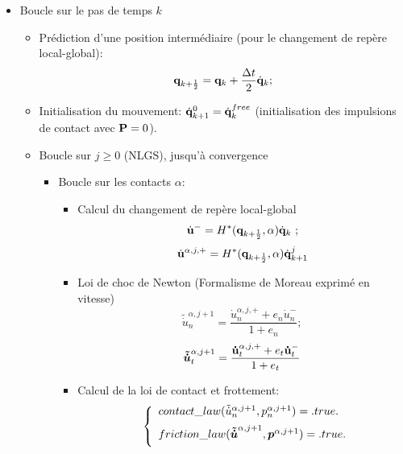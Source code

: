 \begin{itemize}
\item Boucle sur le pas de temps $k$
\begin{itemize}
\item Prédiction d'une position intermédiaire (pour le changement de repère local-global): \\
\begin{equation}\label{globalmapapp1}
{\bf q}_{k+\frac12}={\bf q}_k+\frac{\Delta t}{2}\dot{\bf{q}}_k;
\end{equation}
\item Initialisation du mouvement: $\dot{\bf{q}}^{0}_{k+1}=\dot{\bf{q}}_{k}^{free}$%
(initialisation des impulsions de contact avec ${\bf P}=0$).
\item  Boucle sur $j\geq 0$ (NLGS), jusqu'à convergence
\begin{itemize}
\item Boucle sur les contacts $\alpha$:
\begin{itemize}
\item Calcul du changement de repère local-global
\begin{equation}\label{globalmapapp2}
\dot{\bf  u}^-=H^*({\bf q}_{k+\frac12},\alpha)\dot{\bf{q}}_k\ ;
\end{equation}
\begin{equation}
\dot{\bf u }^{\alpha,j,+}=H^{*}({\bf q}_{k+\frac12},\alpha)\dot{\bf{q}}^{j}_{k+1}
\end{equation}
\item Loi de choc de Newton (Formalisme de Moreau exprimé en vitesse)
\begin{equation}\label{newtonlawen}
\tilde{\dot{u}}_n^{\alpha,j+1}=\frac{\dot{u}_n^{\alpha,j,+}+e_n \dot{u}_n^-}{1+e_n};
\end{equation}
\begin{equation}\label{newtonlawet}
\boldsymbol{\tilde{{\dot{u}}}}_t^{\alpha,j+1}=\frac{\boldsymbol{\dot{\bf u}}_t^{\alpha,j,+}+e_t{\boldsymbol{\dot{\bf u}}}_t^{-}}{1+e_t}
\end{equation}
\item Calcul de la loi de contact et frottement:
\begin{eqnarray}
&& \left\{\begin{array}{lll}
contact\_law(\tilde{\dot{u}}_{n}^{\alpha,j+1},p_{n}^{\alpha,j+1}) = .true. \\[2mm]
friction\_law(\vect{\tilde{\dot{u}}}^{\alpha,j+1},\vect{p}^{\alpha,j+1}) = .true. \\[2mm]
\end{array}\right.

\end{eqnarray}
\end{itemize}
\end{itemize}
\end{itemize}
\end{itemize}

